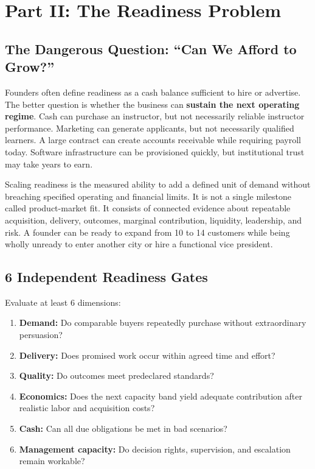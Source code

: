 \section*{Part II: The Readiness Problem}

\subsection{The Dangerous Question: ``Can We Afford to Grow?''}
\label{sec:dangerous_question_afford_growth}

Founders often define readiness as a cash balance sufficient to hire or advertise. The better question is whether the business can \textbf{sustain the next operating regime}. Cash can purchase an instructor, but not necessarily reliable instructor performance. Marketing can generate applicants, but not necessarily qualified learners. A large contract can create accounts receivable while requiring payroll today. Software infrastructure can be provisioned quickly, but institutional trust may take years to earn.

Scaling readiness is the measured ability to add a defined unit of demand without breaching specified operating and financial limits. It is not a single milestone called product-market fit. It consists of connected evidence about repeatable acquisition, delivery, outcomes, marginal contribution, liquidity, leadership, and risk. A founder can be ready to expand from 10 to 14 customers while being wholly unready to enter another city or hire a functional vice president.

\subsection{6 Independent Readiness Gates}
\label{sec:six_readiness_gates}

Evaluate at least 6 dimensions:
\begin{enumerate}
    \item \textbf{Demand:} Do comparable buyers repeatedly purchase without extraordinary persuasion?
    \item \textbf{Delivery:} Does promised work occur within agreed time and effort?
    \item \textbf{Quality:} Do outcomes meet predeclared standards?
    \item \textbf{Economics:} Does the next capacity band yield adequate contribution after realistic labor and acquisition costs?
    \item \textbf{Cash:} Can all due obligations be met in bad scenarios?
    \item \textbf{Management capacity:} Do decision rights, supervision, and escalation remain workable?
\end{enumerate}

